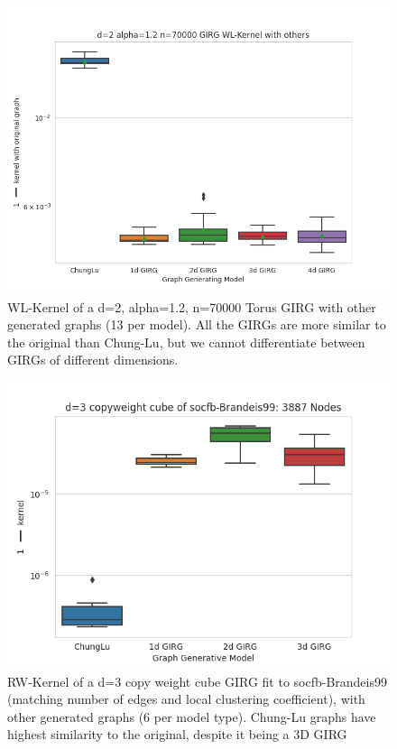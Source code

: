 \begin{figure}
  \centering
\includegraphics[width=0.8\linewidth]{figures/d=2 alpha=1.2 n=70000 GIRG WL-Kernel with others.png}
\caption{WL-Kernel of a d=2, alpha=1.2, n=70000 Torus GIRG with other generated graphs (13 per model). All the GIRGs are more similar to the original than Chung-Lu, but we cannot differentiate between GIRGs of different dimensions.}
\label{fig:wl_kernel_gentorus}
\end{figure}



\begin{figure}
  \centering
\includegraphics[width=0.8\linewidth]{figures/socfb-Brandeis99 d=3.png}
\caption{RW-Kernel of a d=3 copy weight cube GIRG fit to socfb-Brandeis99 (matching number of edges and local clustering coefficient), with other generated graphs (6 per model type). Chung-Lu graphs have highest similarity to the original, despite it being a 3D GIRG}
\label{fig:rw_kernel_fitcopycube}
\end{figure}






